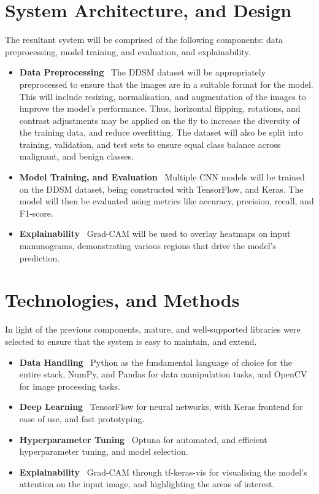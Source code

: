 \documentclass[../main]{subfiles}
\begin{document}
\section{System Architecture, and Design}
The resultant system will be comprised of the following components: data preprocessing, model training, and evaluation, and explainability.

\begin{itemize}
	\item \textbf{Data Preprocessing} \textemdash\ The DDSM dataset will be appropriately preprocessed to ensure that the images are in a suitable format for the model. This will include resizing, normalisation, and augmentation of the images to improve the model's performance. Thus, horizontal flipping, rotations, and contrast adjustments may be applied on the fly to increase the diversity of the training data, and reduce overfitting. The dataset will also be split into training, validation, and test sets to ensure equal class balance across malignant, and benign classes.
	\item \textbf{Model Training, and Evaluation} \textemdash\ Multiple CNN models will be trained on the DDSM dataset, being constructed with TensorFlow, and Keras. The model will then be evaluated using metrics like accuracy, precision, recall, and F1-score.
	\item \textbf{Explainability} \textemdash\ Grad-CAM will be used to overlay heatmaps on input mammograms, demonstrating various regions that drive the model's prediction.
\end{itemize}

\section{Technologies, and Methods}
In light of the previous components, mature, and well-supported libraries were selected to ensure that the system is easy to maintain, and extend.

\begin{itemize}
	\item \textbf{Data Handling} \textemdash\ Python as the fundamental language of choice for the entire stack, NumPy, and Pandas for data manipulation tasks, and OpenCV for image processing tasks.
	\item \textbf{Deep Learning} \textemdash\ TensorFlow for neural networks, with Keras frontend for ease of use, and fast prototyping.
	\item \textbf{Hyperparameter Tuning} \textemdash\ Optuna for automated, and efficient hyperparameter tuning, and model selection.
	\item \textbf{Explainability} \textemdash\ Grad-CAM through tf-keras-vis for visualising the model's attention on the input image, and highlighting the areas of interest.
\end{itemize}
\end{document}
